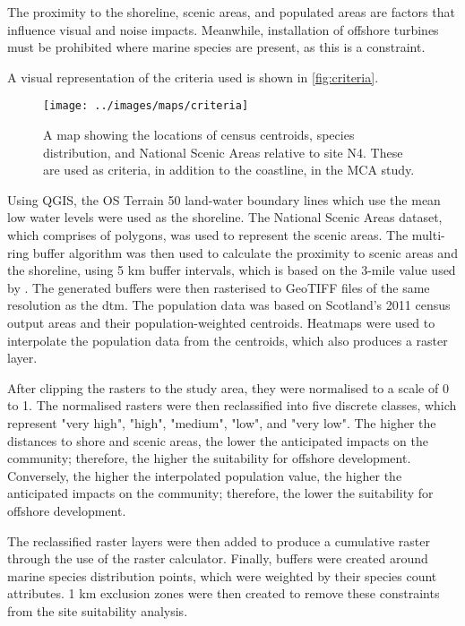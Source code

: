 The proximity to the shoreline, scenic areas, and populated areas are factors that influence visual and noise impacts. Meanwhile, installation of offshore turbines must be prohibited where marine species are present, as this is a constraint.

A visual representation of the criteria used is shown in \autoref{fig:criteria}.

\begin{figure}
  \centering
  \texttt{[image: ../images/maps/criteria]}
  \caption{A map showing the locations of census centroids, species distribution, and National Scenic Areas relative to site N4. These are used as criteria, in addition to the coastline, in the MCA study. \label{fig:criteria}}
\end{figure}

Using QGIS, the OS Terrain 50 land-water boundary lines which use the mean low water levels were used as the shoreline. The National Scenic Areas dataset, which comprises of polygons, was used to represent the scenic areas. The multi-ring buffer algorithm was then used to calculate the proximity to scenic areas and the shoreline, using 5 km buffer intervals, which is based on the 3-mile value used by \textcite{mekonnen2015}. The generated buffers were then rasterised to GeoTIFF files of the same resolution as the \gls{dtm}. The population data was based on Scotland's 2011 census output areas and their population-weighted centroids. Heatmaps were used to interpolate the population data from the centroids, which also produces a raster layer.

After clipping the rasters to the study area, they were normalised to a scale of 0 to 1. The normalised rasters were then reclassified into five discrete classes, which represent "very high", "high", "medium", "low", and "very low". The higher the distances to shore and scenic areas, the lower the anticipated impacts on the community; therefore, the higher the suitability for offshore development. Conversely, the higher the interpolated population value, the higher the anticipated impacts on the community; therefore, the lower the suitability for offshore development.

The reclassified raster layers were then added to produce a cumulative raster through the use of the raster calculator. Finally, buffers were created around marine species distribution points, which were weighted by their species count attributes. 1 km exclusion zones were then created to remove these constraints from the site suitability analysis.

